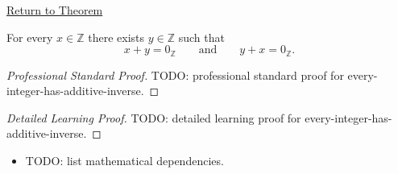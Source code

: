 \newpage
{}
\label{prf:every-integer-has-additive-inverse}

\begin{remark*}[Return]
\hyperref[thm:every-integer-has-additive-inverse]{Return to Theorem}
\end{remark*}

\begin{theorem*}
For every $x\in\mathbb{Z}$ there exists $y\in\mathbb{Z}$ such that
\[
x+y=0_{\mathbb{Z}}
\qquad\text{and}\qquad
y+x=0_{\mathbb{Z}}.
\]
\end{theorem*}

\begin{proof}[Professional Standard Proof]
\LRAProofBodyStart
TODO: professional standard proof for every-integer-has-additive-inverse.
\end{proof}

\begin{proof}[Detailed Learning Proof]
\LRAProofBodyStart
TODO: detailed learning proof for every-integer-has-additive-inverse.
\end{proof}

\begin{remark*}
\end{remark*}

\begin{dependencies}
\begin{itemize}
  \item TODO: list mathematical dependencies.
\end{itemize}
\end{dependencies}

\clearpage
